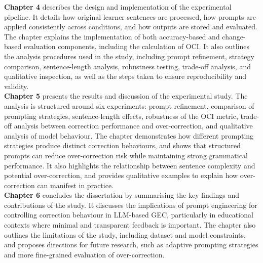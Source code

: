 \textbf{Chapter 4} describes the design and implementation of the experimental pipeline. It details how original learner sentences are processed, how prompts are applied consistently across conditions, and how outputs are stored and evaluated. The chapter explains the implementation of both accuracy-based and change-based evaluation components, including the calculation of OCI. It also outlines the analysis procedures used in the study, including prompt refinement, strategy comparison, sentence-length analysis, robustness testing, trade-off analysis, and qualitative inspection, as well as the steps taken to ensure reproducibility and validity.\\

\textbf{Chapter 5} presents the results and discussion of the experimental study. The analysis is structured around six experiments: prompt refinement, comparison of prompting strategies, sentence-length effects, robustness of the OCI metric, trade-off analysis between correction performance and over-correction, and qualitative analysis of model behaviour. The chapter demonstrates how different prompting strategies produce distinct correction behaviours, and shows that structured prompts can reduce over-correction risk while maintaining strong grammatical performance. It also highlights the relationship between sentence complexity and potential over-correction, and provides qualitative examples to explain how over-correction can manifest in practice.\\

\textbf{Chapter 6} concludes the dissertation by summarising the key findings and contributions of the study. It discusses the implications of prompt engineering for controlling correction behaviour in LLM-based GEC, particularly in educational contexts where minimal and transparent feedback is important. The chapter also outlines the limitations of the study, including dataset and model constraints, and proposes directions for future research, such as adaptive prompting strategies and more fine-grained evaluation of over-correction.\\

